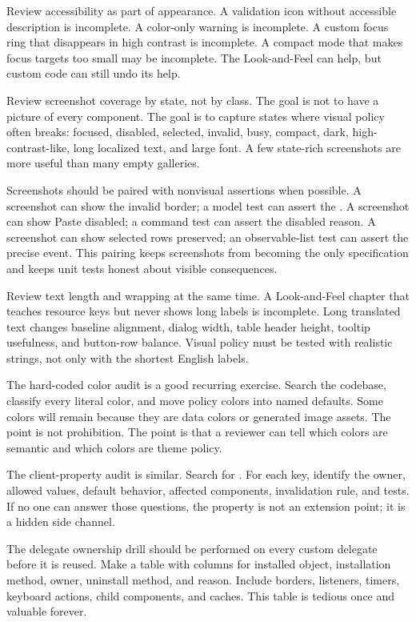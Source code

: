 Review accessibility as part of appearance. A validation icon without accessible description is incomplete. A color-only warning is incomplete. A custom focus ring that disappears in high contrast is incomplete. A compact mode that makes focus targets too small may be incomplete. The Look-and-Feel can help, but custom code can still undo its help.

Review screenshot coverage by state, not by class. The goal is not to have a picture of every component. The goal is to capture states where visual policy often breaks: focused, disabled, selected, invalid, busy, compact, dark, high-contrast-like, long localized text, and large font. A few state-rich screenshots are more useful than many empty galleries.

Screenshots should be paired with nonvisual assertions when possible. A screenshot can show the invalid border; a model test can assert the . A screenshot can show Paste disabled; a command test can assert the disabled reason. A screenshot can show selected rows preserved; an observable-list test can assert the precise event. This pairing keeps screenshots from becoming the only specification and keeps unit tests honest about visible consequences.

Review text length and wrapping at the same time. A Look-and-Feel chapter that teaches resource keys but never shows long labels is incomplete. Long translated text changes baseline alignment, dialog width, table header height, tooltip usefulness, and button-row balance. Visual policy must be tested with realistic strings, not only with the shortest English labels.

The hard-coded color audit is a good recurring exercise. Search the codebase, classify every literal color, and move policy colors into named defaults. Some colors will remain because they are data colors or generated image assets. The point is not prohibition. The point is that a reviewer can tell which colors are semantic and which colors are theme policy.

The client-property audit is similar. Search for . For each key, identify the owner, allowed values, default behavior, affected components, invalidation rule, and tests. If no one can answer those questions, the property is not an extension point; it is a hidden side channel.

The delegate ownership drill should be performed on every custom delegate before it is reused. Make a table with columns for installed object, installation method, owner, uninstall method, and reason. Include borders, listeners, timers, keyboard actions, child components, and caches. This table is tedious once and valuable forever.

